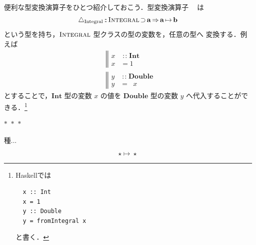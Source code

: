 \documentclass[a5paper,twoside,fleqn,draft]{jsbook}
\newcommand{\separator}{\begin{center}$*$~$*$~$*$\end{center}}
\newcommand{\programminglanguage}[1]{\textsf{#1}}
\newcommand{\haskell}{\programminglanguage{Haskell}}
\newcommand{\mBrace}{\Vert}
\DeclareMathOperator{\mSuperClass}{\Rightarrow}
\DeclareMathOperator{\mSuperSet}{\supset}
\newcommand{\mUpCast}{\bigtriangleup}
\DeclareMathOperator{\mFromIntegral}{\mUpCast_\text{Integral}}
\DeclareMathOperator{\mIn}{{:\!:}}
\DeclareMathOperator{\mMapsTo}{\mapsto}
\newcommand{\mType}[1]{\mathbf{#1}}
\newcommand{\mDoubleType}{\mType{Double}}
\newcommand{\mIntType}{\mType{Int}}
\newcommand{\mGenericTypeClass}[1]{\textsc{#1}} %
\newcommand{\mIntegralTypeClass}{\mGenericTypeClass{Integral}}
\newcommand{\mProj}[2]{#1\mMapsTo#2}
\begin{document}
便利な型変換演算子をひとつ紹介しておこう．型変換演算子
$\mFromIntegral$ は
\begin{equation}
\mFromIntegral \mIn{}\mIntegralTypeClass\mSuperSet\mType{a}
\mSuperClass\mProj{\mType{a}}{\mType{b}}
\end{equation}
という型を持ち，$\mIntegralTypeClass$ 型クラスの型の変数を，任意の型へ
変換する．例えば
\begin{align}
{}&\left\mBrace\begin{aligned} x&\mIn\mIntType\\ x&=1
\end{aligned}\right.\\
{}&\left\mBrace\begin{aligned} y&\mIn\mDoubleType\\ y&=\mFromIntegral
x
\end{aligned}\right.
\end{align}
とすることで，$\mIntType$ 型の変数 $x$ の値を $\mDoubleType$ 型の変数
$y$ へ代入することができる．\footnote{\haskell では
\begin{verbatim}
  x :: Int
  x = 1
  y :: Double
  y = fromIntegral x
\end{verbatim}
と書く．}

\separator

種...

\begin{equation*}
\mProj{\star}{\star}
\end{equation*}
\end{document}
